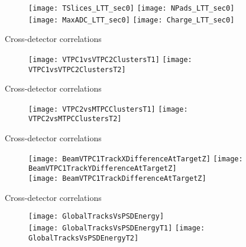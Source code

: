 \documentclass[11pt]{beamer}
\begin{document}
\begin{frame}{}
\begin{figure}
\centering
\texttt{[image: TSlices\_LTT\_sec0]}
\texttt{[image: NPads\_LTT\_sec0]}\\
\texttt{[image: MaxADC\_LTT\_sec0]}
\texttt{[image: Charge\_LTT\_sec0]}
\end{figure}
\end{frame}


\begin{frame}{Cross-detector correlations}
  \begin{figure}
    \texttt{[image: VTPC1vsVTPC2ClustersT1]}
    \texttt{[image: VTPC1vsVTPC2ClustersT2]}
  \end{figure}
\end{frame}
\begin{frame}{Cross-detector correlations}
  \begin{figure}
    \texttt{[image: VTPC2vsMTPCClustersT1]}
    \texttt{[image: VTPC2vsMTPCClustersT2]}
  \end{figure}
\end{frame}

\begin{frame}{Cross-detector correlations}
  \begin{figure}
    \texttt{[image: BeamVTPC1TrackXDifferenceAtTargetZ]}
    \texttt{[image: BeamVTPC1TrackYDifferenceAtTargetZ]}\\
    \texttt{[image: BeamVTPC1TrackDifferenceAtTargetZ]}
  \end{figure}
\end{frame}



\begin{frame}{Cross-detector correlations}
  \begin{figure}
    \texttt{[image: GlobalTracksVsPSDEnergy]}\\
    \texttt{[image: GlobalTracksVsPSDEnergyT1]}
    \texttt{[image: GlobalTracksVsPSDEnergyT2]}
  \end{figure}
\end{frame}
\end{document}
